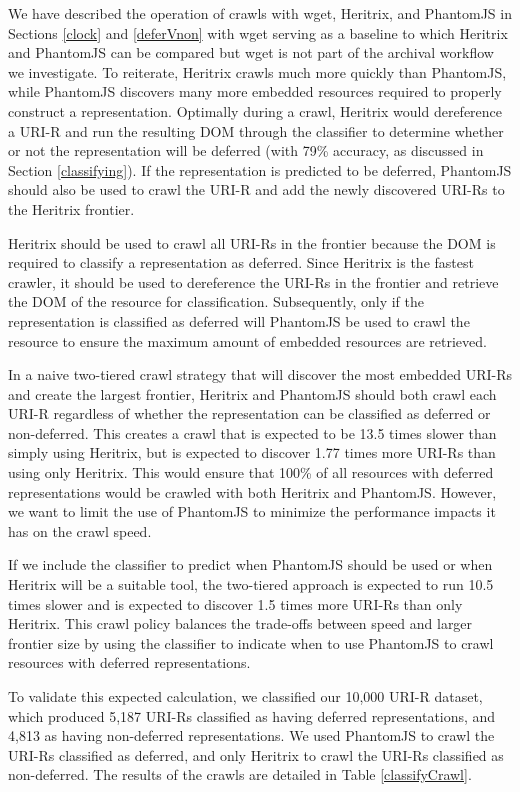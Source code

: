 \documentclass{ipres_proc_article-sp}
\begin{document}
We have described the operation of crawls with wget, Heritrix, and PhantomJS in Sections \ref{clock} and \ref{deferVnon} with wget serving as a baseline to which Heritrix and PhantomJS can be compared but wget is not part of the archival workflow we investigate. To reiterate, Heritrix crawls much more quickly than PhantomJS, while PhantomJS discovers many more embedded resources required to properly construct a representation. Optimally during a crawl, Heritrix would dereference a URI-R and run the resulting DOM through the classifier to determine whether or not the representation will be deferred (with 79\% accuracy, as discussed in Section \ref{classifying}). If the representation is predicted to be deferred, PhantomJS should also be used to crawl the URI-R and add the newly discovered URI-Rs to the Heritrix frontier.

Heritrix should be used to crawl all URI-Rs in the frontier because the DOM is required to classify a representation as deferred. Since Heritrix is the fastest crawler, it should be used to dereference the URI-Rs in the frontier and retrieve the DOM of the resource for classification. Subsequently, only if the representation is classified as deferred will PhantomJS be used to crawl the resource to ensure the maximum amount of embedded resources are retrieved.

In a naive two-tiered crawl strategy that will discover the most embedded URI-Rs and create the largest frontier, Heritrix and PhantomJS should both crawl each URI-R regardless of whether the representation can be classified as deferred or non-deferred. This creates a crawl that is expected to be 13.5 times slower than simply using Heritrix, but is expected to discover 1.77 times more URI-Rs than using only Heritrix. This would ensure that 100\% of all resources with deferred representations would be crawled with both Heritrix and PhantomJS. However, we want to limit the use of PhantomJS to minimize the performance impacts it has on the crawl speed.

If we include the classifier to predict when PhantomJS should be used or when Heritrix will be a suitable tool, the two-tiered approach is expected to run 10.5 times slower and is expected to discover 1.5 times more URI-Rs than only Heritrix. This crawl policy balances the trade-offs between speed and larger frontier size by using the classifier to indicate when to use PhantomJS to crawl resources with deferred representations.

To validate this expected calculation, we classified our 10,000 URI-R dataset, which produced 5,187 URI-Rs classified as having deferred representations, and 4,813 as having non-deferred representations. We used PhantomJS to crawl the URI-Rs classified as deferred, and only Heritrix to crawl the URI-Rs classified as non-deferred. The results of the crawls are detailed in Table \ref{classifyCrawl}.
\end{document}
